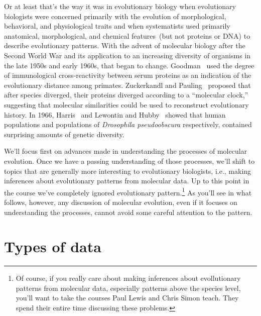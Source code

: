 \documentclass[12pt]{article}
\begin{document}
Or at least that's the way it was in evolutionary biology when
evolutionary biologists were concerned primarily with the evolution of
morphological, behavioral, and physiological traits and when
systematists used primarily anatomical, morphological, and chemical
features~(but not proteins or DNA) to describe evolutionary
patterns. With the advent of molecular biology after the Second World
War and its application to an increasing diversity of organisms in the
late 1950s and early 1960s, that began to
change. Goodman~\cite{Goodman62} used the degree of immunological
cross-reactivity between serum proteins as an indication of the
evolutionary distance among primates. Zuckerkandl and
Pauling~\cite{Zuckerkandl-Pauling65} proposed that after species
diverged, their proteins diverged according to a ``molecular
clock,'' suggesting that molecular similarities
could be used to reconstruct evolutionary history. In 1966,
Harris~\cite{Harris66} and Lewontin and
Hubby~\cite{Hubby-Lewontin66,Lewontin-Hubby66} showed that human
populations and populations of {\it Drosophila pseudoobscura\/}
respectively, contained surprising amounts of genetic
diversity.

We'll focus first on advances made in understanding the processes of
molecular evolution. Once we have a passing understanding of those
processes, we'll shift to topics that are generally more interesting
to evolutionary biologists, i.e., making inferences about evolutionary
patterns from molecular data. Up to this point in the course we've
completely ignored evolutionary pattern.\footnote{Of course, if you
  really care about making inferences about evollutionary patterns
  from molecular data, especially patterns above the species level,
  you'll want to take the courses Paul Lewis and Chris Simon
  teach. They spend their entire time discussing these problems.}  As
you'll see in what follows, however, any discussion of molecular
evolution, even if it focuses on understanding the processes, cannot
avoid some careful attention to the pattern.

\section*{Types of data}
\end{document}
